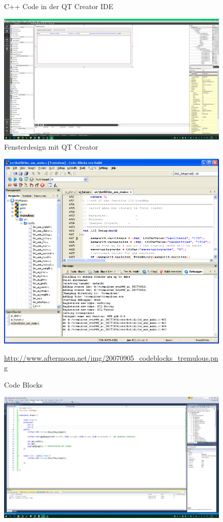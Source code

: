 \documentclass[a4paper]{report}
\begin{document}
\begin{center}
\begin{figure}
	\caption{C++ Code in der QT Creator IDE}
	\label{pic:qt_code}
\end{figure}
\begin{figure}
	\includegraphics[width = \textwidth]{01/qt_designer.png}
	\caption{Fensterdesign mit QT Creator}
	\label{pic:qt_designer}
\end{figure}
\begin{figure}
	\centering
	\includegraphics[width = 13cm]{01/codeblocks.png}
	\caption{Code Blocks}
	\label{pic:code::blocks}
	\url{http://www.aftermoon.net/img/20070905_codeblocks_tremulous.png}
\end{figure}
\begin{figure}
	\includegraphics[width = \textwidth]{01/vs.png}

\end{figure}
\end{center}
\end{document}
